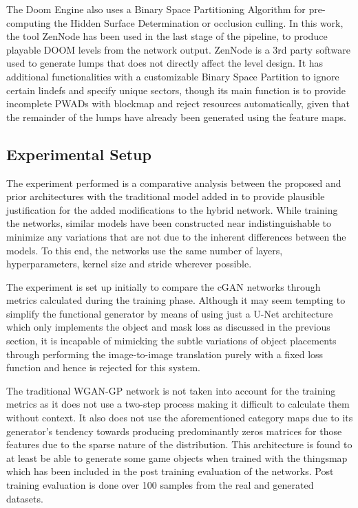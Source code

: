 \documentclass{Configuration_Files/PoliMi3i_thesis}
\begin{document}
The Doom Engine also uses a Binary Space Partitioning Algorithm for pre-computing 
the Hidden Surface Determination or occlusion culling. In this work, the 
tool ZenNode \cite{MaR04} has been used in the last stage of the pipeline, to produce playable 
DOOM levels from the network output. ZenNode is a 3rd party software used to 
generate lumps that does not directly affect the level design. It has additional 
functionalities with a customizable Binary Space Partition to ignore certain 
lindefs and specify unique sectors, though its main function is to provide 
incomplete PWADs with blockmap and reject resources automatically, given 
that the remainder of the lumps have already been generated using the feature maps.

\subsection{Experimental Setup}
The experiment performed is a comparative analysis between the proposed and prior 
architectures with the traditional model added in to provide plausible justification for 
the added modifications to the hybrid network. While training 
the networks, similar models have been constructed near indistinguishable to 
minimize any variations that are not due to the inherent differences between the 
models. To this end, the networks use the same number of layers, hyperparameters, 
kernel size and stride wherever possible. 

The experiment is set up initially to compare the cGAN networks through metrics 
calculated during the training phase. Although it may seem tempting to simplify the 
functional generator by means of using just a U-Net architecture which only implements the 
object and mask loss as discussed in the previous section, it is incapable of mimicking 
the subtle variations of object placements through performing the image-to-image 
translation purely with a fixed loss function and hence is rejected for this system.

The traditional WGAN-GP network is not taken into account for the training metrics as it does not 
use a two-step process making it difficult to calculate them without context. It also 
does not use the aforementioned category maps due to its generator’s tendency 
towards producing predominantly zeros matrices for those features due to the sparse 
nature of the distribution. This architecture is found to at least be able to generate 
some game objects when trained with the thingsmap which has been 
included in the post training evaluation of the networks. Post training evaluation is 
done over 100 samples from the real and generated datasets.
\end{document}
